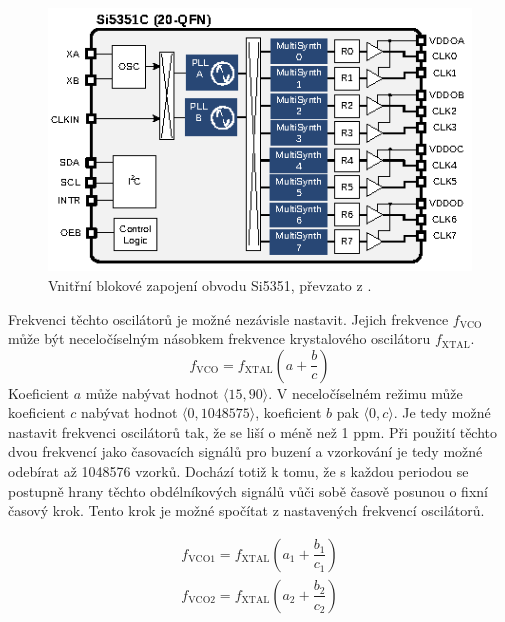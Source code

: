 \begin{figure}[htbp]
\includegraphics[width=\textwidth,keepaspectratio]{images/si5351_internal_architecture_overview.eps}\caption{Vnitřní blokové zapojení obvodu Si5351, převzato z \cite{Si5351datasheet}.} \label{si5351_internal_architecture_overview}
\end{figure}

Frekvenci těchto oscilátorů je možné nezávisle nastavit. Jejich frekvence $f_\mathrm{VCO}$ může být neceločíselným násobkem frekvence krystalového oscilátoru $f_\mathrm{XTAL}$.
\begin{equation}
f_\mathrm{VCO}=f_\mathrm{XTAL} \left(a+\dfrac{b}{c} \right)
\end{equation}
Koeficient $a$ může nabývat hodnot $\langle 15, 90 \rangle$. V neceločíselném režimu může koeficient $c$ nabývat hodnot $\langle 0, 1048575 \rangle$, koeficient $b$ pak $\langle 0, c \rangle$.
Je tedy možné nastavit frekvenci oscilátorů tak, že se liší o méně než 1 ppm. Při použití těchto dvou frekvencí jako časovacích signálů pro buzení a vzorkování je tedy možné odebírat až 1048576 vzorků. Dochází totiž k tomu, že s každou periodou se postupně hrany těchto obdélníkových signálů vůči sobě časově posunou o fixní časový krok. Tento krok je možné spočítat z nastavených frekvencí oscilátorů.

\begin{equation}
\begin{gathered}
f_\mathrm{VCO1}=f_\mathrm{XTAL} \left(a_1+\dfrac{b_1}{c_1} \right) \\
f_\mathrm{VCO2}=f_\mathrm{XTAL} \left(a_2+\dfrac{b_2}{c_2} \right)
\end{gathered}
\end{equation}

